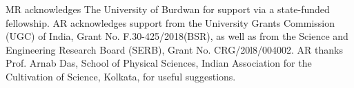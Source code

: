 \documentclass[%
reprint,
superscriptaddress,
amsmath,amssymb,
aps,
prb,
showkeys,
]{revtex4-2}
\begin{document}
\begin{acknowledgments}
MR acknowledges The University of Burdwan for support via a state-funded fellowship. AR acknowledges support from the University Grants Commission (UGC) of India, Grant No. F.30-425/2018(BSR), as well as from the Science and Engineering Research Board (SERB), Grant No. CRG/20l8/004002.
AR thanks Prof. Arnab Das, School of Physical Sciences, Indian Association for the Cultivation of Science, Kolkata, for useful suggestions.
\end{acknowledgments}


\end{document}
